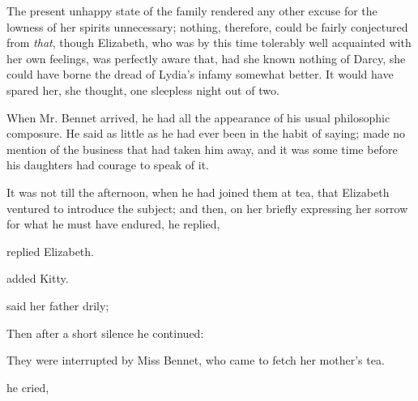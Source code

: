 The present unhappy state of the family rendered any other excuse for the lowness of her spirits unnecessary; nothing, therefore, could be fairly conjectured from {\em that}, though Elizabeth, who was by this time tolerably well acquainted with her own feelings, was perfectly aware that, had she known nothing of Darcy, she could have borne the dread of Lydia's infamy somewhat better. It would have spared her, she thought, one sleepless night out of two.

When Mr. Bennet arrived, he had all the appearance of his usual philosophic composure. He said as little as he had ever been in the habit of saying; made no mention of the business that had taken him away, and it was some time before his daughters had courage to speak of it.

It was not till the afternoon, when he had joined them at tea, that Elizabeth ventured to introduce the subject; and then, on her briefly expressing her sorrow for what he must have endured, he replied, 

 replied Elizabeth.




 added Kitty.

 said her father drily; 

Then after a short silence he continued:


They were interrupted by Miss Bennet, who came to fetch her mother's tea.

 he cried, 

